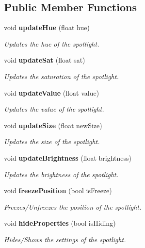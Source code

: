 \subsection*{Public Member Functions}
\begin{DoxyCompactItemize}
\item 
void {\bf update\+Hue} (float hue)
\begin{DoxyCompactList}\small\item\em Updates the hue of the spotlight. \end{DoxyCompactList}\item 
void {\bf update\+Sat} (float sat)
\begin{DoxyCompactList}\small\item\em Updates the saturation of the spotlight. \end{DoxyCompactList}\item 
void {\bf update\+Value} (float value)
\begin{DoxyCompactList}\small\item\em Updates the value of the spotlight. \end{DoxyCompactList}\item 
void {\bf update\+Size} (float new\+Size)
\begin{DoxyCompactList}\small\item\em Updates the size of the spotlight. \end{DoxyCompactList}\item 
void {\bf update\+Brightness} (float brightness)
\begin{DoxyCompactList}\small\item\em Updates the brightness of the spotlight. \end{DoxyCompactList}\item 
void {\bf freeze\+Position} (bool is\+Freeze)
\begin{DoxyCompactList}\small\item\em Freezes/\+Unfreezes the position of the spotlight. \end{DoxyCompactList}\item 
void {\bf hide\+Properties} (bool is\+Hiding)
\begin{DoxyCompactList}\small\item\em Hides/\+Shows the settings of the spotlight. \end{DoxyCompactList}\end{DoxyCompactItemize}
